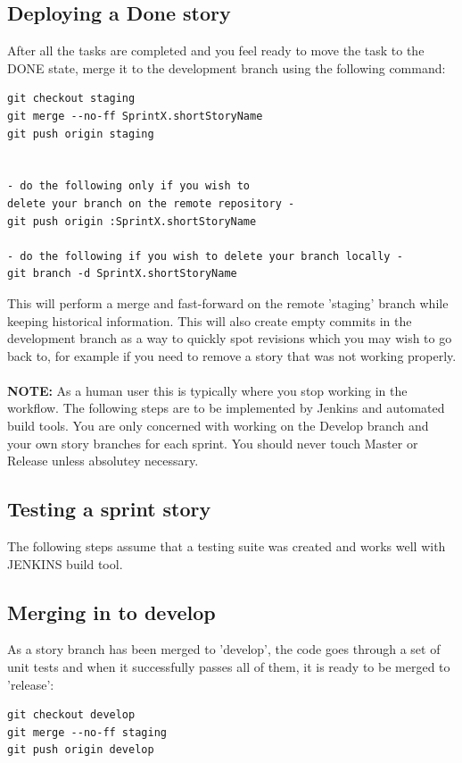 \subsection{Deploying a Done story}

After all the tasks are completed and you feel ready to move the task to the DONE state, merge it to the development branch using the following command:\\

\begin{verbatim}
git checkout staging
git merge --no-ff SprintX.shortStoryName
git push origin staging


- do the following only if you wish to 
delete your branch on the remote repository -
git push origin :SprintX.shortStoryName

- do the following if you wish to delete your branch locally -  
git branch -d SprintX.shortStoryName
\end{verbatim}
This will perform a merge and fast-forward on the remote 'staging' branch while keeping historical information.
This will also create empty commits in the development branch as a way to quickly spot revisions which you may wish to go back to, for example if you need to remove a story that was not working properly.\\\\
\textbf {NOTE:}
As a human user this is typically where you stop working in the workflow. The following steps are to be implemented by Jenkins and automated build tools. You are only concerned with working on the Develop branch and your own story branches for each sprint. You should never touch Master or Release unless absolutey necessary.

\subsection{Testing a sprint story}

The following steps assume that a testing suite was created and works well with JENKINS build tool. 

\subsection{Merging in to develop}
As a story branch has been merged to 'develop', the code goes through a set of unit tests and when it successfully passes all of them, it is ready to be merged to 'release': 
\begin{verbatim}
git checkout develop
git merge --no-ff staging
git push origin develop
\end{verbatim}

